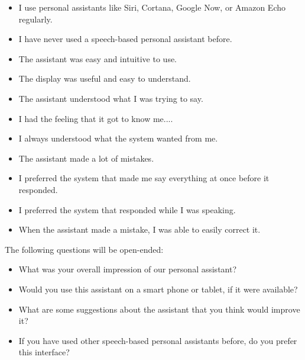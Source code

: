 \documentclass[a4paper,10pt]{article}
\begin{document}
\begin{itemize}
 \item I use personal assistants like Siri, Cortana, Google Now, or Amazon Echo regularly.
 \item I have never used a speech-based personal assistant before. 
 \item The assistant was easy and intuitive to use.
 \item The display was useful and easy to understand.
 \item The assistant understood what I was trying to say.
 \item I had the feeling that it got to know me....
 \item I always understood what the system wanted from me.
 \item The assistant made a lot of mistakes.
 \item I preferred the system that made me say everything at once before it responded.
 \item I preferred the system that responded while I was speaking. 
 \item When the assistant made a mistake, I was able to easily correct it.
\end{itemize}


The following questions will be open-ended:

\begin{itemize}
 \item What was your overall impression of our personal assistant?
 \item Would you use this assistant on a smart phone or tablet, if it were available?
 \item What are some suggestions about the assistant that you think would improve it?
 \item If you have used other speech-based personal assistants before, do you prefer this interface?
 
\end{itemize}



% 
% 
% 
% 





% 
% 
\end{document}
